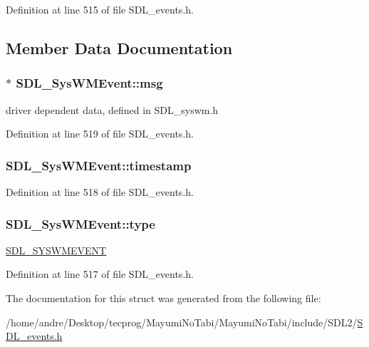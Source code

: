 Definition at line 515 of file S\-D\-L\-\_\-events.\-h.



\subsection{Member Data Documentation}
\hypertarget{struct_s_d_l___sys_w_m_event_ad5e3dc68aa15582cd0641847d41c74e8}{
\subsubsection[{msg}]{$\ast$ S\-D\-L\-\_\-\-Sys\-W\-M\-Event\-::msg}}\label{struct_s_d_l___sys_w_m_event_ad5e3dc68aa15582cd0641847d41c74e8}
driver dependent data, defined in S\-D\-L\-\_\-syswm.\-h 

Definition at line 519 of file S\-D\-L\-\_\-events.\-h.

\hypertarget{struct_s_d_l___sys_w_m_event_a5d3cb97006d99b620c2671c27bd82c06}{
\subsubsection[{timestamp}]{ S\-D\-L\-\_\-\-Sys\-W\-M\-Event\-::timestamp}}\label{struct_s_d_l___sys_w_m_event_a5d3cb97006d99b620c2671c27bd82c06}


Definition at line 518 of file S\-D\-L\-\_\-events.\-h.

\hypertarget{struct_s_d_l___sys_w_m_event_a84697e96cb16bf6a570e10b5bfdcd392}{
\subsubsection[{type}]{ S\-D\-L\-\_\-\-Sys\-W\-M\-Event\-::type}}\label{struct_s_d_l___sys_w_m_event_a84697e96cb16bf6a570e10b5bfdcd392}
\hyperlink{_s_d_l__events_8h_a3b589e89be6b35c02e0dd34a55f3fccaa73749d735a18ce6ef17a09ee70d5dbe7}{S\-D\-L\-\_\-\-S\-Y\-S\-W\-M\-E\-V\-E\-N\-T} 

Definition at line 517 of file S\-D\-L\-\_\-events.\-h.



The documentation for this struct was generated from the following file\-:\begin{DoxyCompactItemize}
\item 
/home/andre/\-Desktop/tecprog/\-Mayumi\-No\-Tabi/\-Mayumi\-No\-Tabi/include/\-S\-D\-L2/\hyperlink{_s_d_l__events_8h}{S\-D\-L\-\_\-events.\-h}\end{DoxyCompactItemize}
